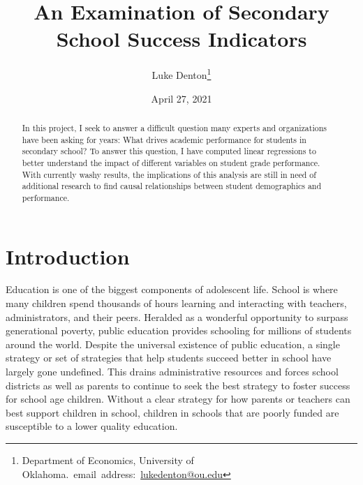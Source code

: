 \documentclass[12pt,english]{article}
\begin{document}
\begin{singlespace}
\title{An Examination of Secondary School Success Indicators}
\end{singlespace}

\author{Luke Denton\thanks{Department of Economics, University of Oklahoma.\
email~address:~\href{mailto:lukedenton@ou.edu}{lukedenton@ou.edu}}}

\date{April 27, 2021}

\maketitle

\begin{abstract}
\begin{singlespace}
In this project, I seek to answer a difficult question many experts and organizations have been asking for years: What drives academic performance for students in secondary school? To answer this question, I have computed linear regressions to better understand the impact of different variables on student grade performance. With currently washy results, the implications of this analysis are still in need of additional research to find causal relationships between student demographics and performance.
\end{singlespace}

\end{abstract}
\vfill{}


\pagebreak{}


\section{Introduction}\label{sec:intro}
Education is one of the biggest components of adolescent life. School is where many children spend thousands of hours learning and interacting with teachers, administrators, and their peers. Heralded as a wonderful opportunity to surpass generational poverty, public education provides schooling for millions of students around the world. Despite the universal existence of public education, a single strategy or set of strategies that help students succeed better in school have largely gone undefined. This drains administrative resources and forces school districts as well as parents to continue to seek the best strategy to foster success for school age children. Without a clear strategy for how parents or teachers can best support children in school, children in schools that are poorly funded are susceptible to a lower quality education. 
\end{document}
